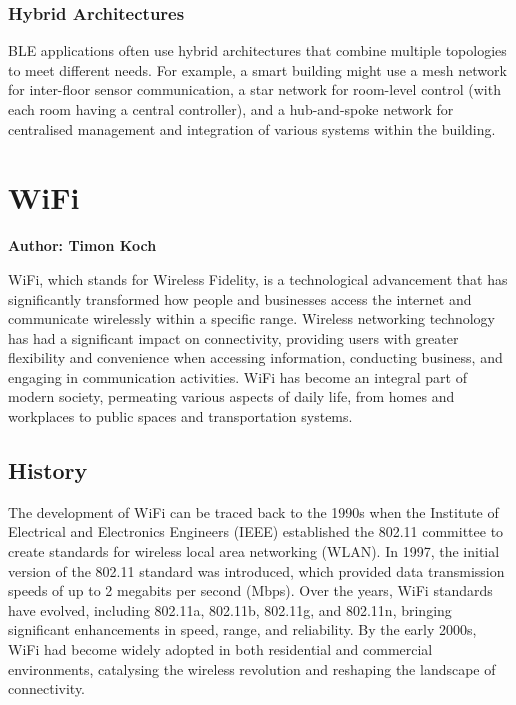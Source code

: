 \subsubsection{Hybrid Architectures}
BLE applications often use hybrid architectures that combine multiple topologies to meet different needs. For example, a smart building might use a mesh network for inter-floor sensor communication, a star network for room-level control (with each room having a central controller), and a hub-and-spoke network for centralised management and integration of various systems within the building.

\section{WiFi}
\textbf{Author: Timon Koch}

WiFi, which stands for Wireless Fidelity, is a technological advancement that has significantly transformed how people and businesses access the internet and communicate wirelessly within a specific range. Wireless networking technology has had a significant impact on connectivity, providing users with greater flexibility and convenience when accessing information, conducting business, and engaging in communication activities. WiFi has become an integral part of modern society, permeating various aspects of daily life, from homes and workplaces to public spaces and transportation systems.

\subsection{History}
The development of WiFi can be traced back to the 1990s when the Institute of Electrical and Electronics Engineers (IEEE) established the 802.11 committee to create standards for wireless local area networking (WLAN). In 1997, the initial version of the 802.11 standard was introduced, which provided data transmission speeds of up to 2 megabits per second (Mbps). Over the years, WiFi standards have evolved, including 802.11a, 802.11b, 802.11g, and 802.11n, bringing significant enhancements in speed, range, and reliability. By the early 2000s, WiFi had become widely adopted in both residential and commercial environments, catalysing the wireless revolution and reshaping the landscape of connectivity.


